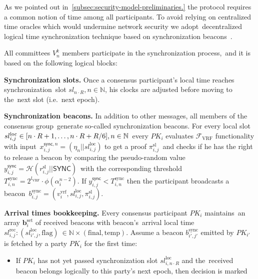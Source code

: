 As we pointed out in~\ref{subsec:security-model-preliminaries.} the protocol requires a common notion of time among all participants.
To avoid relying on centralized time oracles which would undermine network security we adopt\
decentralized logical time synchronization technique based on synchronization beacons~\cite{cryptoeprint:2019/838}.

All committees $V_{n}^k$ members participate in the synchronization process,\
and it is based on the following logical blocks:
\begin{legal}
    \item[]\textbf{Synchronization slots.} Once a consensus participant’s local time reaches synchronization\
    slot ${sl_{n \cdot R}, n \in \mathbb{N}}$, his clocks are adjusted before moving to the\
    next slot (i.e.\ next epoch).
    \item[]\textbf{Synchronization beacons.} In addition to other messages, all members of the consensus group\
    generate so-called synchronization beacons.
    For every local slot $sl_{i, j}^{\text{loc}} \in [n \cdot R + 1,\dots,n \cdot R + R \// 6], n \in \mathbb{N}$\
    every $PK_i$ evaluates $\mathcal{F}_{\text{VRF}}$ functionality with input\
    ${x_{i, j}^{\textsf{sync}, n} = (\eta_n || sl_{i, j}^{\text{loc}})}$ to get a proof $\pi_{i, j}^{\text{sl}}$\
    and checks if he has the right to release a beacon by comparing the pseudo-random value\
    ${y_{i, j}^{\textsf{sync}} = \mathcal{H}(r_{i, j}^{\text{sl}} || \textsf{SYNC})}$\
    with the corresponding threshold $T_{i, n}^{\text{sync}} = 2^{l_{\text{VRF}}} \cdot \phi(\alpha_{i}^{n - 2})$.
    If ${y_{i, j}^{\textsf{sync}} < T_{i, n}^{\text{sync}}}$ then the participant broadcasts a beacon\
    $b_{i, j}^{\text{sync}} = (v^{\text{vrf}}_i, sl_{i, j}^{\text{loc}}, \pi_{i, j}^{\text{sl}})$.
    \item[]\textbf{Arrival times bookkeeping.} Every consensus participant $PK_i$ maintains\
    an array $\mathbf{b}_i^{\text{set}}$ of received beacons with beacon's\
    arrival local time ${sl^{\text{rec}}_{i, j}: (sl_{i', j}^{\text{loc}}, \text{flag})\
    \in \mathbb{N} \times (\text{final}, \text{temp})}$.
    Assume a beacon $b_{i', j'}^{\text{sync}}$ emitted by $PK_{i'}$ is fetched by a party $PK_i$ for the first time:
    \begin{itemize}
        \item If $PK_i$ has not yet passed synchronization slot $sl_{i, n \cdot R}^{\text{loc}}$ and the\
        received beacon belongs logically to this party’s next epoch, then decision is marked\

\end{itemize}
\end{legal}

